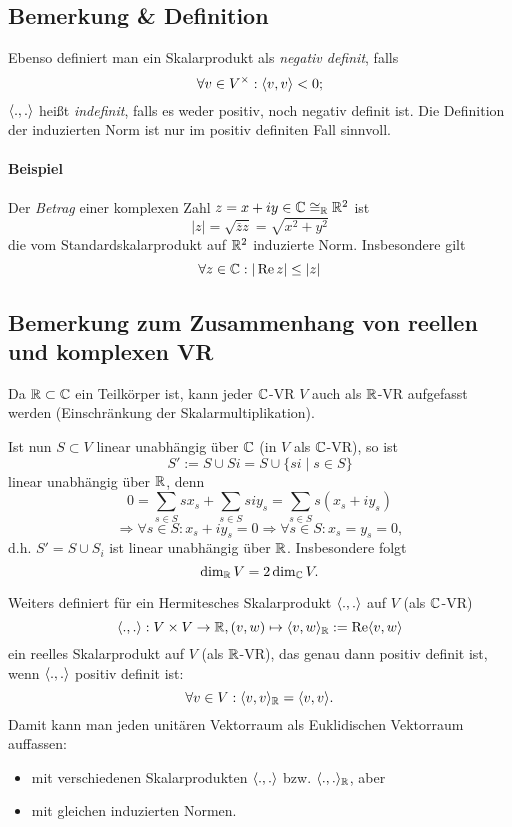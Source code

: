 \subsection{Bemerkung \& Definition}
\begin{Definition}
	Ebenso definiert man ein Skalarprodukt als \emph{negativ definit}, falls
		\[ \forall v\in V^\times: \langle  v,v \rangle < 0; \]
	$ \langle .,. \rangle $ heißt \emph{indefinit}, falls es weder positiv, noch negativ definit ist.
	Die Definition der induzierten Norm ist nur im positiv definiten Fall sinnvoll.
\end{Definition}


\paragraph{Beispiel}	
	Der \emph{Betrag} einer komplexen Zahl
		$ z=x+iy\in \mathbb{C}\cong_{\mathbb{R}} \mathbb{R}^2 $
	ist 
		\[ |z| = \sqrt{\overline{z}z} = \sqrt{x^2+y^2} \]
	die vom Standardskalarprodukt auf $ \mathbb{R}^2 $ induzierte Norm.
	Insbesondere gilt
		\[ \forall z\in \mathbb{C}: |\operatorname{Re} z| \leq |z| \]	
\subsection{Bemerkung zum Zusammenhang von reellen und komplexen VR}
	Da $ \mathbb{R}\subset \mathbb{C} $ ein Teilkörper ist, kann jeder $ \mathbb{C} $-VR $ V $ auch als $ \mathbb{R} $-VR aufgefasst werden (Einschränkung der Skalarmultiplikation).
	
	Ist nun $ S\subset V $ linear unabhängig über $ \mathbb{C} $ (in $ V $ als $ \mathbb{C} $-VR), so ist
		\[ S' := S\cup Si = S \cup \{si\mid s\in S\} \]
	linear unabhängig über $ \mathbb{R} $, denn
		\[ 0 = \sum_{s\in S}sx_s + \sum_{s\in S}siy_s = \sum_{s\in S} s (x_s+iy_s) \]
		\[ \Rightarrow \forall s\in S: x_s + iy_s = 0\Rightarrow \forall s\in S: x_s = y_s = 0, \]
	d.h. $ S' = S\cup S_i $ ist linear unabhängig über $ \mathbb{R} $.
	Insbesondere folgt
		\[ \dim_{\mathbb{R}} V = 2\dim_{\mathbb{C}} V.  \]

	Weiters definiert für ein Hermitesches Skalarprodukt $ \langle  .,.  \rangle $ auf $ V $ (als $ \mathbb{C} $-VR)
		\[ \langle  .,.  \rangle :V\times V\to \mathbb{R}, (v,w)\mapsto \langle  v,w  \rangle_{\mathbb{R}} := \operatorname{Re} \langle v,w  \rangle \]
	ein reelles Skalarprodukt auf $ V $ (als $ \mathbb{R} $-VR), das genau dann positiv definit ist, wenn $ \langle .,.  \rangle $ positiv definit ist:
		\[ \forall v\in V: \langle v,v  \rangle_{\mathbb{R}} = \langle v,v  \rangle. \]
	Damit kann man jeden unitären Vektorraum als Euklidischen Vektorraum auffassen:
		\begin{itemize}
			\item mit verschiedenen Skalarprodukten $ \langle .,. \rangle $ bzw. $ \langle .,. \rangle_{\mathbb{R}} $, aber
			\item mit gleichen induzierten Normen. %
		\end{itemize}

